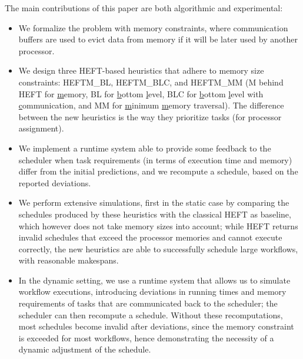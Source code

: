 \documentclass[conference]{IEEEtran}
\newcommand{\algo}[1]{\textsc{#1}}
\newcommand{\heftmm}{\algo{HEFTM\_MM}\xspace}
\newcommand{\heftbl}{\algo{HEFTM\_BL}\xspace}
\newcommand{\heftblc}{\algo{HEFTM\_BLC}\xspace}
\newcommand{\hmey}[1]{{\color{red}[HM: #1]}}
\begin{document}
    The main contributions of this paper are both algorithmic and experimental:
    \begin{itemize}
\item We formalize the problem with memory constraints, where communication buffers
are used to evict data from memory if it will be later used by another processor. 
\item We design three HEFT-based heuristics
    that adhere to memory size constraints: \heftbl, \heftblc, and \heftmm
    (M behind HEFT for \underline{m}emory, BL for \underline{b}ottom \underline{l}evel,
    BLC for \underline{b}ottom \underline{l}evel with \underline{c}ommunication, 
    and MM for \underline{m}inimum \underline{m}emory traversal).
    The difference between the new heuristics is the way they prioritize tasks (for processor assignment).
    
    \item We implement a runtime system able to provide some feedback to the scheduler
    when task requirements (in terms of execution time and memory) differ from the initial predictions, 
    and we recompute a schedule, based on the reported deviations. 
    
    \item We perform extensive simulations, first in the static case by comparing the schedules produced 
    by these heuristics with the classical HEFT as baseline, which however does not take memory sizes into account; 
    while HEFT returns invalid schedules that exceed the processor memories and cannot execute correctly,
    the new heuristics are able to successfully schedule large workflows, with reasonable makespans.
    
    \item In the dynamic setting, we use a runtime system that allows us to simulate workflow executions,
    introducing deviations in running times and memory requirements of tasks that are communicated
    back to the scheduler; the scheduler can then recompute a schedule. Without these recomputations,
    most schedules become invalid after deviations, since the memory constraint is exceeded 
    for most workflows, hence demonstrating the necessity of a dynamic adjustment of the schedule. 

    
    \end{itemize}
\end{document}

